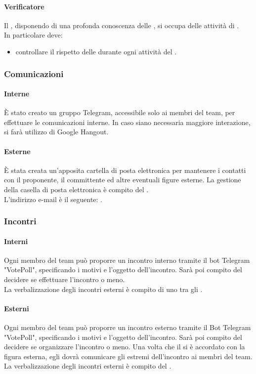  \paragraph{Verificatore}
 Il \VER , disponendo di una profonda conoscenza delle \NPdoc , si occupa delle attività di . \\
 In particolare deve: 
 \begin{itemize}
  \item controllare il rispetto delle \NPdoc durante ogni attività del .
 \end{itemize} 
\subsubsection{Comunicazioni}
 \paragraph{Interne}
 È stato creato un gruppo Telegram, accessibile solo ai membri del team, per effettuare le comunicazioni interne. In caso siano necessaria maggiore interazione, si farà utilizzo di Google Hangout. 
 \paragraph{Esterne}
 È stata creata un'apposita cartella di posta elettronica per mantenere i contatti con il proponente, il committente ed altre eventuali figure esterne.
 La gestione della casella di posta elettronica è compito del \RESP. \\
 L'indirizzo e-mail è il seguente: \EMAIL{} .
\subsubsection{Incontri}
 \paragraph{Interni}
 Ogni membro del team può proporre un incontro interno tramite il bot Telegram "VotePoll", specificando i motivi e l'oggetto dell'incontro. 
 Sarà poi compito del \RESP{} decidere se effettuare l'incontro o meno.\\
  La verbalizzazione degli incontri esterni è compito di uno tra gli \AMMP.
 \paragraph{Esterni} 
 Ogni membro del team può proporre un incontro esterno tramite il Bot Telegram "VotePoll", specificando i motivi e l'oggetto dell'incontro. 
 Sarà poi compito del \RESP{} decidere se organizzare l'incontro o meno. Una volta che il \RESP{} si è accordato con la figura esterna, egli dovrà comunicare gli estremi dell'incontro ai membri del team.\\
 La verbalizzazione degli incontri esterni è compito del \RESP.
